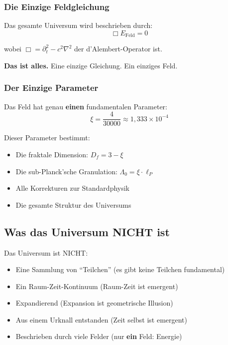 	\subsubsection{Die Einzige Feldgleichung}

	Das gesamte Universum wird beschrieben durch:
	\begin{equation}
		\boxed{\Box E_{\text{Feld}} = 0}
	\end{equation}

	wobei $\Box = \partial_t^2 - c^2 \nabla^2$ der d'Alembert-Operator ist.

	\textbf{Das ist alles.} Eine einzige Gleichung. Ein einziges Feld.

	\subsubsection{Der Einzige Parameter}

	Das Feld hat genau \textbf{einen} fundamentalen Parameter:
	\begin{equation}
		\boxed{\xi = \frac{4}{30000} \approx 1{,}333 \times 10^{-4}}
	\end{equation}

	Dieser Parameter bestimmt:
	\begin{itemize}
		\item Die fraktale Dimension: $D_f = 3 - \xi$
		\item Die sub-Planck'sche Granulation: $\Lambda_0 = \xi \cdot \ell_P$
		\item Alle Korrekturen zur Standardphysik
		\item Die gesamte Struktur des Universums
	\end{itemize}

	\subsection{Was das Universum NICHT ist}

	\begin{important}
		Das Universum ist NICHT:
		\begin{itemize}
			\item Eine Sammlung von \enquote{Teilchen} (es gibt keine Teilchen fundamental)
			\item Ein Raum-Zeit-Kontinuum (Raum-Zeit ist emergent)
			\item Expandierend (Expansion ist geometrische Illusion)
			\item Aus einem Urknall entstanden (Zeit selbst ist emergent)
			\item Beschrieben durch viele Felder (nur \textbf{ein} Feld: Energie)
		\end{itemize}
	\end{important}

